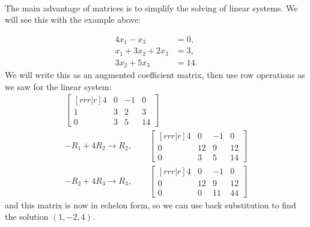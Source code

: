 ~
\phantom{Here's some text}

The main advantage of matrices is to simplify the solving of linear systems.   We will see this with the example above:

\begin{align*}
4x_1 - x_3 & = 0, \\
x_1+3x_2 +2x_3 & = 3, \\
3x_2 + 5x_3 & = 14.
\end{align*}
We will write this as an augmented coefficient matrix, then use row operations as we saw for the linear system:
%
\begin{align*}
\begin{bmatrix}[rrr|r]
4 & 0 & -1 & 0 \\
1 & 3 & 2 & 3 \\
0 & 3 & 5 & 14
\end{bmatrix} \\
-R_1 + 4R_2 \rightarrow R_2,  \qquad
\begin{bmatrix}[rrr|r]
4 & 0 & -1 & 0 \\
0 & 12 & 9 & 12 \\
0 & 3 & 5 & 14
\end{bmatrix} \\
-R_2 + 4R_3 \rightarrow R_3, \qquad
\begin{bmatrix}[rrr|r]
4 & 0 & -1 & 0 \\
0 & 12 & 9 & 12 \\
0 & 0 & 11 & 44
\end{bmatrix}
\end{align*}
and this matrix is now in echelon form, so we can use back substitution to find the solution $(1,-2,4)$.

